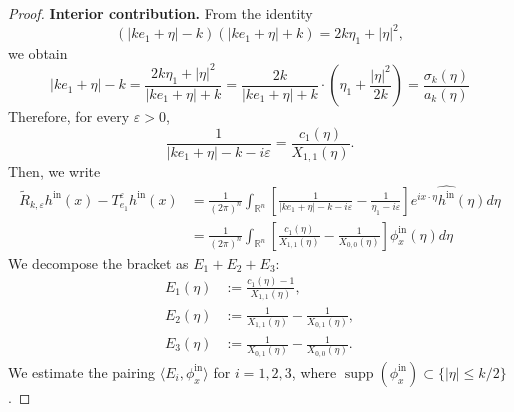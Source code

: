 \documentclass[12pt,a4paper]{amsart}
\numberwithin{equation}{section}
\theoremstyle{plain}
\theoremstyle{definition}
\begin{document}
\begin{proof}
\textbf{Interior contribution.} From the identity
\begin{equation*}
    (|ke_1+\eta|-k)(|ke_1+\eta|+k) = 2k\eta_1+|\eta|^2,
\end{equation*}
we obtain 
\begin{equation*}
    |ke_1+\eta|-k = \frac{2k\eta_1+|\eta|^2}{|ke_1+\eta|+k} = \frac{2k}{|ke_1+\eta|+k} \cdot \left( \eta_1 + \frac{|\eta|^2}{2k} \right) = \frac{\sigma_k(\eta)}{a_k(\eta)}
\end{equation*}
Therefore, for every $\varepsilon>0$,
\begin{equation}\label{eq:exact_factor}
  \frac{1}{|ke_1+\eta|-k-i\varepsilon}
  = \frac{c_1(\eta)}{X_{1,1}(\eta)}.
\end{equation}
Then, we write
\begin{align*}
   \widetilde{R}_{k,\varepsilon} h^{\mathrm{in}}(x)-T_{e_1}^\varepsilon h^{\mathrm{in}}(x)
  & =  \frac{1}{(2\pi)^n}\int_{\mathbb{R}^n} \left[   \frac{1}{|ke_1+\eta|-k-i\varepsilon} - \frac{1}{\eta_1 - i \varepsilon} \right]e^{ix\cdot\eta}\widehat{h^{\mathrm{in}}}(\eta) d\eta\\
    & = \frac{1}{(2\pi)^n}\int_{\mathbb{R}^n}
    \left[\frac{c_1(\eta)}{X_{1,1}(\eta)}
    -\frac{1}{X_{0,0}(\eta)}\right]\phi_x^{\mathrm{in}}(\eta) d\eta
\end{align*}
We decompose the bracket as $E_1+E_2+E_3$:
\begin{align*}
  E_1(\eta) &:= \frac{c_1(\eta)-1}{X_{1,1}(\eta)},\\
  E_2(\eta) &:= \frac{1}{X_{1,1}(\eta)} - \frac{1}{X_{0,1}(\eta)},\\
  E_3(\eta) &:= \frac{1}{X_{0,1}(\eta)} - \frac{1}{X_{0,0}(\eta)}.
\end{align*}
We estimate the pairing $\langle E_i, \phi_x^{\mathrm{in}} \rangle$
for $i = 1, 2, 3$, where
$\operatorname{supp}(\phi_x^{\mathrm{in}}) \subset \{|\eta| \leq k/2\}$.


\end{proof}
\end{document}
